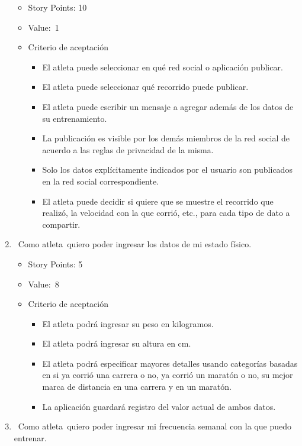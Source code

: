 \begin{enumerate}
  \begin{itemize}
  \item
    Story Points: 10
  \item
    Value:~1
  \item
    Criterio de aceptación

    \begin{itemize}
    \item
      El atleta puede seleccionar en qué red social o aplicación
      publicar.
    \item
      El atleta puede seleccionar qué recorrido puede publicar.
    \item
      El atleta puede escribir un mensaje a agregar además de los datos
      de su entrenamiento.
    \item
      La publicación es visible por los demás miembros de la red social
      de acuerdo a las reglas de privacidad de la misma.
    \item
      Solo los datos explícitamente indicados por el usuario son
      publicados en la red social correspondiente.
    \item
      El atleta puede decidir si quiere que se muestre el recorrido que
      realizó, la velocidad con la que corrió, etc., para cada tipo de
      dato a compartir.
    \end{itemize}
  \end{itemize}
\item
  ~Como atleta~quiero poder ingresar los datos de mi estado físico.

  \begin{itemize}
  \item
    Story Points: 5
  \item
    Value:~8
  \item
    Criterio de aceptación

    \begin{itemize}
    \item
      El atleta podrá ingresar su peso en kilogramos.
    \item
      El atleta podrá ingresar su altura en cm.
    \item
      El atleta podrá especificar mayores detalles usando categorías
      basadas en si ya corrió una carrera o no, ya corrió un maratón o
      no, su mejor marca de distancia en una carrera y en un maratón.
    \item
      La aplicación guardará registro del valor actual de ambos datos.
    \end{itemize}
  \end{itemize}
\item
  ~Como atleta~quiero poder ingresar mi frecuencia semanal con la que
  puedo entrenar.


\end{enumerate}
